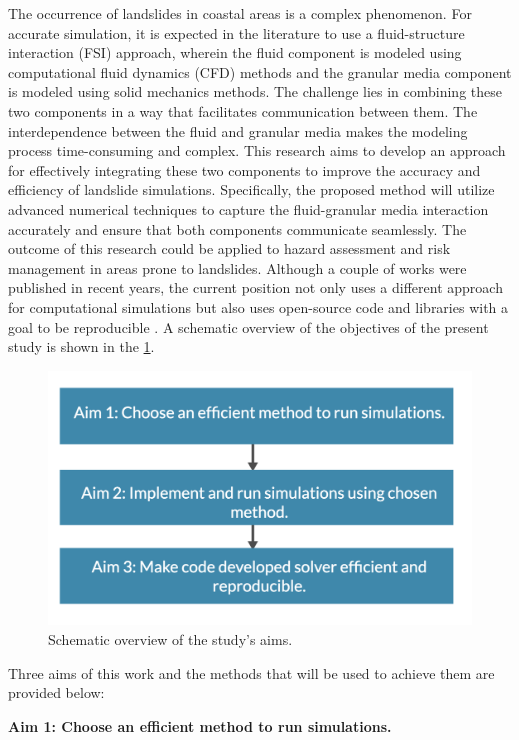 The occurrence of landslides in coastal areas is a complex phenomenon. For accurate simulation, it is expected in the literature to use a fluid-structure interaction (\ac{FSI}) \cite{belytschko1980fsi} approach, wherein the fluid component is modeled using computational fluid dynamics (CFD) methods and the granular media component is modeled using solid mechanics methods. The challenge lies in combining these two components in a way that facilitates communication between them. The interdependence between the fluid and granular media makes the modeling process time-consuming and complex. This research aims to develop an approach for effectively integrating these two components to improve the accuracy and efficiency of landslide simulations. Specifically, the proposed method will utilize advanced numerical techniques to capture the fluid-granular media interaction accurately and ensure that both components communicate seamlessly. The outcome of this research could be applied to hazard assessment and risk management in areas prone to landslides. Although a couple of works were published in recent years, the current position not only uses a different approach for computational simulations but also uses open-source code and libraries with a goal to be reproducible \cite{NAS2019}. A schematic overview of the objectives of the present study is shown in the \ref{fig:aims}.

\begin{figure}[!ht]
    \centering
    \includegraphics[width=12cm]{GWU_Thesis_Sarmakeeva/Images/chap1/Aims.png}
    \caption{Schematic overview of the study's aims.}
    \label{fig:aims}
\end{figure}
Three aims of this work and the methods that will be used to achieve them are provided below:

\textbf{Aim 1: Choose an efficient method to run simulations.}

